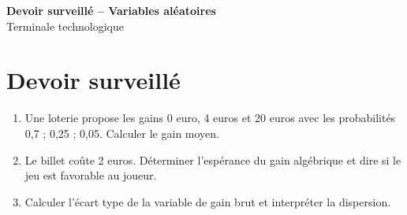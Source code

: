 \documentclass[french,11pt]{book}
\begin{document}
\begin{center}
{\Large \textbf{Devoir surveillé -- Variables aléatoires}}\\[2mm]
Terminale technologique
\end{center}

\section*{Devoir surveillé}
\begin{enumerate}
  \item Une loterie propose les gains 0 euro, 4 euros et 20 euros avec les probabilités 0,7 ; 0,25 ; 0,05. Calculer le gain moyen.
  \item Le billet coûte 2 euros. Déterminer l'espérance du gain algébrique et dire si le jeu est favorable au joueur.
  \item Calculer l'écart type de la variable de gain brut et interpréter la dispersion.
\end{enumerate}
\end{document}
